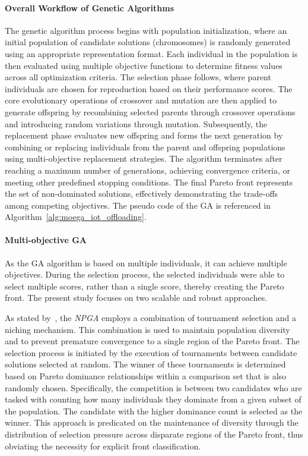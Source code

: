 \documentclass[preprint,3p,authoryear]{elsarticle}
\begin{document}
\paragraph{Overall Workflow of Genetic Algorithms}
The genetic algorithm process begins with population initialization, where an initial population of candidate solutions (chromosomes) is randomly generated using an appropriate representation format. Each individual in the population is then evaluated using multiple objective functions to determine fitness values across all optimization criteria. The selection phase follows, where parent individuals are chosen for reproduction based on their performance scores. The core evolutionary operations of crossover and mutation are then applied to generate offspring by recombining selected parents through crossover operations and introducing random variations through mutation. Subsequently, the replacement phase evaluates new offspring and forms the next generation by combining or replacing individuals from the parent and offspring populations using multi-objective replacement strategies. The algorithm terminates after reaching a maximum number of generations, achieving convergence criteria, or meeting other predefined stopping conditions. The final Pareto front represents the set of non-dominated solutions, effectively demonstrating the trade-offs among competing objectives. The pseudo code of the GA is referenced in Algorithm~\ref{alg:moega_iot_offloading}.

\paragraph{Multi-objective GA} As the GA algorithm is based on multiple individuals, it can achieve multiple objectives. During the selection process, the selected individuals were able to select multiple scores, rather than a single score, thereby creating the Pareto front. The present study focuses on two scalable and robust approaches. 

As stated by~\citep{horn1994npga}, the \emph{NPGA} employs a combination of tournament selection and a niching mechanism. This combination is used to maintain population diversity and to prevent premature convergence to a single region of the Pareto front. The selection process is initiated by the execution of tournaments between candidate solutions selected at random. The winner of these tournaments is determined based on Pareto dominance relationships within a comparison set that is also randomly chosen. Specifically, the competition is between two candidates who are tasked with counting how many individuals they dominate from a given subset of the population. The candidate with the higher dominance count is selected as the winner. This approach is predicated on the maintenance of diversity through the distribution of selection pressure across disparate regions of the Pareto front, thus obviating the necessity for explicit front classification.
\end{document}
